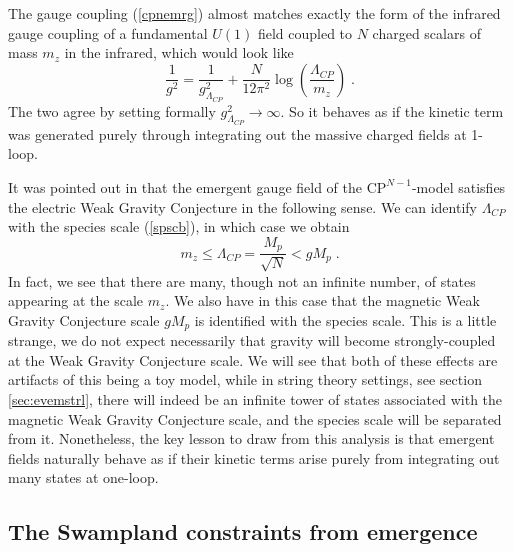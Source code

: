 \documentclass[11pt,a4paper]{article}
\numberwithin{equation}{section}
\numberwithin{table}{section}\setlength{\multlinegap}{25pt}
\newcommand{\be}{\begin{equation}}
\newcommand{\ee}{\end{equation}}
\begin{document}
{The gauge coupling (\ref{cpnemrg}) almost matches exactly the form of the infrared gauge coupling of a fundamental $U(1)$ field coupled to $N$ charged scalars of mass $m_z$ in the infrared, which would look like
\be
\frac{1}{g^2} = \frac{1}{g^2_{\Lambda_{CP}}} + \frac{N}{12 \pi^2} \log \left( \frac{\Lambda_{CP}}{m_z}\right) \;.
\ee
The two agree by setting formally $g^2_{\Lambda_{CP}} \rightarrow \infty$. So it behaves as if the kinetic term was generated purely through integrating out the massive charged fields at 1-loop. 

It was pointed out in \cite{Harlow:2015lma} that the emergent gauge field of the $\mathrm{CP}^{N-1}$-model satisfies the electric Weak Gravity Conjecture in the following sense. We can identify $\Lambda_{CP}$ with the species scale (\ref{spscb}), in which case we obtain
\be
m_z \leq \Lambda_{CP} = \frac{M_p}{\sqrt{N}} < g M_p \;.
\ee
In fact, we see that there are many, though not an infinite number, of states appearing at the scale $m_z$. We also have in this case that the magnetic Weak Gravity Conjecture scale $g M_p$ is identified with the species scale. This is a little strange, we do not expect necessarily that gravity will become strongly-coupled at the Weak Gravity Conjecture scale. We will see that both of these effects are artifacts of this being a toy model, while in string theory settings, see section \ref{sec:evemstrl}, there will indeed be an infinite tower of states associated with the magnetic Weak Gravity Conjecture scale, and the species scale will be separated from it. Nonetheless, the key lesson to draw from this analysis is that emergent fields naturally behave as if their kinetic terms arise purely from integrating out many states at one-loop.

\subsection{The Swampland constraints from emergence}
\label{sec:emeswam}

}
\end{document}
